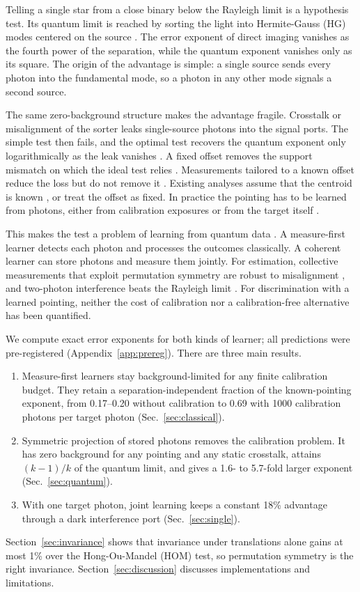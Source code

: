 \documentclass[reprint,pra,aps,amsmath,amssymb,superscriptaddress,nofootinbib]{revtex4-2}
\begin{document}
Telling a single star from a close binary below the Rayleigh limit is a hypothesis test. Its quantum limit is
reached by sorting the light into Hermite-Gauss (HG) modes centered on the source \cite{Tsang2016,Lu2018,Grace2022}.
The error exponent of direct imaging vanishes as the fourth power of the separation, while the quantum exponent
vanishes only as its square. The origin of the advantage is simple: a single source sends every photon into the
fundamental mode, so a photon in any other mode signals a second source.

The same zero-background structure makes the advantage fragile. Crosstalk or misalignment of the sorter leaks
single-source photons into the signal ports. The simple test then fails, and the optimal test recovers the quantum
exponent only logarithmically as the leak vanishes \cite{Schlichtholz2023}. A fixed offset removes the support
mismatch on which the ideal test relies \cite{Kariya2026}. Measurements tailored to a known offset reduce the loss
but do not remove it \cite{deAlmeida2021}. Existing analyses assume that the centroid is known \cite{Zanforlin2022},
or treat the offset as fixed. In practice the pointing has to be learned from photons, either from calibration
exposures or from the target itself \cite{Grace2020}.

This makes the test a problem of learning from quantum data \cite{Sentis2012,Guta2010,Sentis2015}. A measure-first
learner detects each photon and processes the outcomes classically. A coherent learner can store photons and
measure them jointly. For estimation, collective measurements that exploit permutation symmetry are robust to
misalignment \cite{deAlmeida2025}, and two-photon interference beats the Rayleigh limit
\cite{Parniak2018,Muratore2024}. For discrimination with a learned pointing, neither the cost of calibration nor a
calibration-free alternative has been quantified.

We compute exact error exponents for both kinds of learner; all predictions were pre-registered
(Appendix~\ref{app:prereg}). There are three main results.
\begin{enumerate}
\item Measure-first learners stay background-limited for any finite calibration budget. They retain a
  separation-independent fraction of the known-pointing exponent, from 0.17--0.20 without calibration to 0.69 with
  1000 calibration photons per target photon (Sec.~\ref{sec:classical}).
\item Symmetric projection of stored photons removes the calibration problem. It has zero background for any
  pointing and any static crosstalk, attains $(k-1)/k$ of the quantum limit, and gives a 1.6- to 5.7-fold larger
  exponent (Sec.~\ref{sec:quantum}).
\item With one target photon, joint learning keeps a constant 18\% advantage through a dark interference port
  (Sec.~\ref{sec:single}).
\end{enumerate}
Section~\ref{sec:invariance} shows that invariance under translations alone gains at most 1\% over the
Hong-Ou-Mandel (HOM) test, so permutation symmetry is the right invariance. Section~\ref{sec:discussion} discusses
implementations and limitations.
\end{document}
